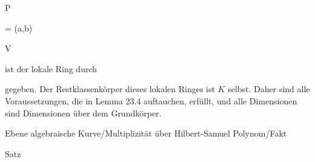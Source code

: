 \mavergleichskette

{\vergleichskette

{ P
}

{ = }{ (a,b)
}

{ \in }{ V
}

{    }{
}

{   }{
}

}
{}{}{}
ist der lokale Ring durch

 gegeben. Der Restklassenkörper dieses lokalen Ringes ist $K$ selbst. Daher sind alle Voraussetzungen, die in
Lemma 23.4
auftauchen, erfüllt, und alle Dimensionen sind Dimensionen über dem Grundkörper.



{Ebene algebraische Kurve/Multiplizität über Hilbert-Samuel Polynom/Fakt}

{Satz}

{}

{


\faktsituation {}



\faktzusatz {}

\faktzusatz {}


}

